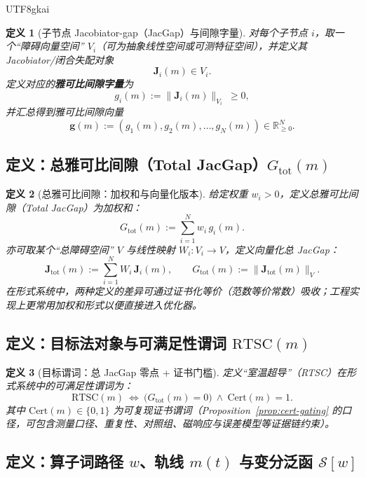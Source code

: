 \documentclass[12pt]{article}
\newtheorem{definition}{定义}[section]
\newcommand{\RTSC}{\textsf{RTSC}}
\begin{document}
\begin{CJK*}{UTF8}{gkai}
\begin{definition}[子节点 Jacobiator-gap（JacGap）与间隙字量]
\label{def:rtsc-jacgap-subnode}
对每个子节点 $i$，取一个“障碍向量空间” $V_i$（可为抽象线性空间或可测特征空间），并定义其 Jacobiator/闭合失配对象
\[
\mathbf{J}_i(m)\in V_i.
\]
定义对应的\textbf{雅可比间隙字量}为
\[
g_i(m):=\|\mathbf{J}_i(m)\|_{V_i}\ \ge 0,
\]
并汇总得到雅可比间隙向量
\[
\mathbf{g}(m):=(g_1(m),g_2(m),\dots,g_N(m))\in \mathbb{R}_{\ge 0}^N.
\]
\end{definition}

\subsection{定义：总雅可比间隙（Total JacGap）$G_{\mathrm{tot}}(m)$}

\begin{definition}[总雅可比间隙：加权和与向量化版本]
\label{def:rtsc-total-jacgap}
给定权重 $w_i>0$，定义总雅可比间隙（Total JacGap）为加权和：
\[
G_{\mathrm{tot}}(m):=\sum_{i=1}^N w_i\,g_i(m).
\]
亦可取某个“总障碍空间” $V$ 与线性映射 $W_i:V_i\to V$，定义向量化总 JacGap：
\[
\mathbf{J}_{\mathrm{tot}}(m):=\sum_{i=1}^N W_i\,\mathbf{J}_i(m),
\qquad
G_{\mathrm{tot}}(m):=\|\mathbf{J}_{\mathrm{tot}}(m)\|_{V}.
\]
在形式系统中，两种定义的差异可通过证书化等价（范数等价常数）吸收；工程实现上更常用加权和形式以便直接进入优化器。
\end{definition}

\subsection{定义：目标法对象与可满足性谓词 $\mathrm{RTSC}(m)$}

\begin{definition}[目标谓词：总 JacGap 零点 + 证书门槛]
\label{def:rtsc-predicate-jacgap}
定义“室温超导”（\RTSC{}）在形式系统中的可满足性谓词为：
\[
\mathrm{RTSC}(m)\ \Longleftrightarrow\ \bigl(G_{\mathrm{tot}}(m)=0\bigr)\ \wedge\ \mathrm{Cert}(m)=1.
\]
其中 $\mathrm{Cert}(m)\in\{0,1\}$ 为可复现证书谓词（Proposition~\ref{prop:cert-gating} 的口径，可包含测量口径、重复性、对照组、磁响应与误差模型等证据链约束）。
\end{definition}

\subsection{定义：算子词路径 $w$、轨线 $m(t)$ 与变分泛函 $\mathcal{S}[w]$}


\end{CJK*}
\end{document}
